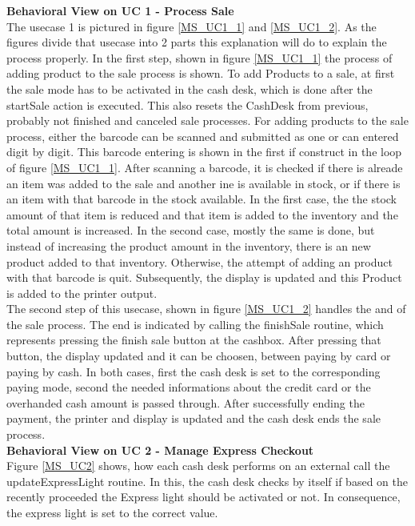		\textbf{Behavioral View on UC 1 - Process Sale} \\
		The usecase 1 is pictured in figure \ref{MS_UC1_1} and \ref{MS_UC1_2}. As the figures divide that usecase into 2 parts this explanation will do to explain the process properly.
		In the first step, shown in figure \ref{MS_UC1_1} the process of adding product to the sale process is shown. To add Products to a sale, at first the sale mode has to be activated in the cash desk, which is done after the startSale action is executed. This also resets the CashDesk from previous, probably not finished and canceled sale processes.
		For adding products to the sale process, either the barcode can be scanned and submitted as one or can entered digit by digit. This barcode entering is shown in the first if construct in the loop of figure \ref{MS_UC1_1}.
		After scanning a barcode, it is checked if there is alreade an item was added to the sale and another ine is available in stock, or if there is an item with that barcode in the stock available. In the first case, the the stock amount of that item is reduced and that item is added to the inventory and the total amount is increased. In the second case, mostly the same is done, but instead of increasing the product amount in the inventory, there is an new product added to that inventory. Otherwise, the attempt of adding an product with that barcode is quit. Subsequently, the display is updated and this Product is added to the printer output.\\
		The second step of this usecase, shown in figure \ref{MS_UC1_2} handles the and of the sale process. The end is indicated by calling the finishSale routine, which represents pressing the finish sale button at the cashbox. After pressing that button, the display updated and it can be choosen, between paying by card or paying by cash. In both cases, first the cash desk is set to the corresponding paying mode, second the needed informations about the credit card or the overhanded cash amount is passed through. 
		After successfully ending the payment, the printer and display is updated and the cash desk ends the sale process.\\
		 
		
		\textbf{Behavioral View on UC 2 - Manage Express Checkout} \\
		Figure \ref{MS_UC2} shows, how each cash desk performs on an external call the updateExpressLight routine. In this, the cash desk checks by itself if based on the recently proceeded the Express light should be activated or not. In consequence, the express light is set to the correct value. \\
		
